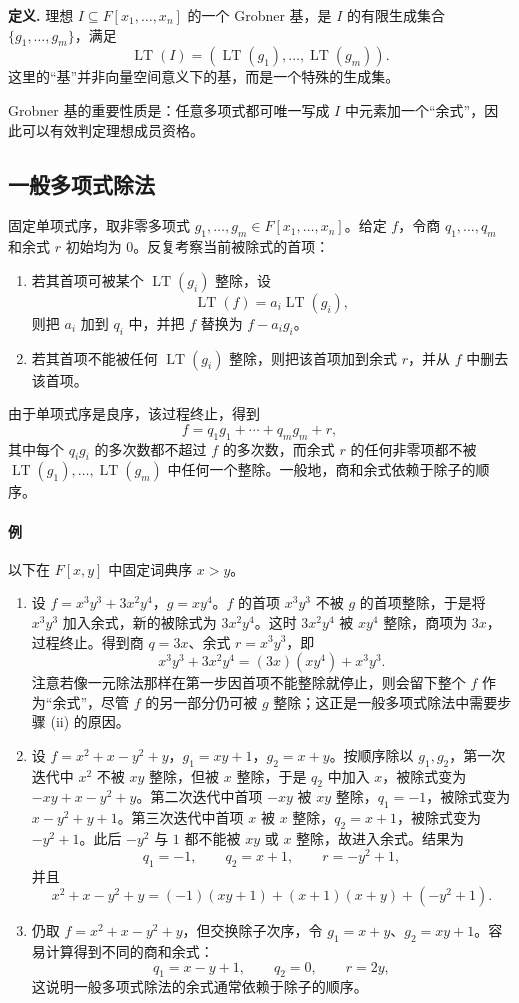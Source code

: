 \noindent\textbf{定义.} 理想 $I\subseteq F[x_1,\ldots,x_n]$ 的一个 Grobner 基，是 $I$ 的有限生成集合 $\{g_1,\ldots,g_m\}$，满足
\[
\operatorname{LT}(I)=(\operatorname{LT}(g_1),\ldots,\operatorname{LT}(g_m)).
\]
这里的“基”并非向量空间意义下的基，而是一个特殊的生成集。

Grobner 基的重要性质是：任意多项式都可唯一写成 $I$ 中元素加一个“余式”，因此可以有效判定理想成员资格。

\subsection*{一般多项式除法}
固定单项式序，取非零多项式 $g_1,\ldots,g_m\in F[x_1,\ldots,x_n]$。给定 $f$，令商 $q_1,\ldots,q_m$ 和余式 $r$ 初始均为 $0$。反复考察当前被除式的首项：
\begin{enumerate}[label=(\roman*)]
	\item 若其首项可被某个 $\operatorname{LT}(g_i)$ 整除，设
	\[
	\operatorname{LT}(f)=a_i\operatorname{LT}(g_i),
	\]
	则把 $a_i$ 加到 $q_i$ 中，并把 $f$ 替换为 $f-a_i g_i$。
	\item 若其首项不能被任何 $\operatorname{LT}(g_i)$ 整除，则把该首项加到余式 $r$，并从 $f$ 中删去该首项。
\end{enumerate}
由于单项式序是良序，该过程终止，得到
\[
f=q_1g_1+\cdots+q_mg_m+r,
\]
其中每个 $q_i g_i$ 的多次数都不超过 $f$ 的多次数，而余式 $r$ 的任何非零项都不被 $\operatorname{LT}(g_1),\ldots,\operatorname{LT}(g_m)$ 中任何一个整除。一般地，商和余式依赖于除子的顺序。

\paragraph{例}
以下在 $F[x,y]$ 中固定词典序 $x>y$。
\begin{enumerate}[label=(\arabic*)]
	\item 设 $f=x^3y^3+3x^2y^4$，$g=xy^4$。$f$ 的首项 $x^3y^3$ 不被 $g$ 的首项整除，于是将 $x^3y^3$ 加入余式，新的被除式为 $3x^2y^4$。这时 $3x^2y^4$ 被 $xy^4$ 整除，商项为 $3x$，过程终止。得到商 $q=3x$、余式 $r=x^3y^3$，即
\[
x^3y^3+3x^2y^4=(3x)(xy^4)+x^3y^3.
\]
注意若像一元除法那样在第一步因首项不能整除就停止，则会留下整个 $f$ 作为“余式”，尽管 $f$ 的另一部分仍可被 $g$ 整除；这正是一般多项式除法中需要步骤 (ii) 的原因。
	\item 设 $f=x^2+x-y^2+y$，$g_1=xy+1$，$g_2=x+y$。按顺序除以 $g_1,g_2$，第一次迭代中 $x^2$ 不被 $xy$ 整除，但被 $x$ 整除，于是 $q_2$ 中加入 $x$，被除式变为 $-xy+x-y^2+y$。第二次迭代中首项 $-xy$ 被 $xy$ 整除，$q_1=-1$，被除式变为 $x-y^2+y+1$。第三次迭代中首项 $x$ 被 $x$ 整除，$q_2=x+1$，被除式变为 $-y^2+1$。此后 $-y^2$ 与 $1$ 都不能被 $xy$ 或 $x$ 整除，故进入余式。结果为
\[
q_1=-1,
\qquad q_2=x+1,
\qquad r=-y^2+1,
\]
并且
\[
x^2+x-y^2+y=(-1)(xy+1)+(x+1)(x+y)+(-y^2+1).
\]
	\item 仍取 $f=x^2+x-y^2+y$，但交换除子次序，令 $g_1=x+y$、$g_2=xy+1$。容易计算得到不同的商和余式：
\[
q_1=x-y+1,
\qquad q_2=0,
\qquad r=2y,
\]
这说明一般多项式除法的余式通常依赖于除子的顺序。
\end{enumerate}

